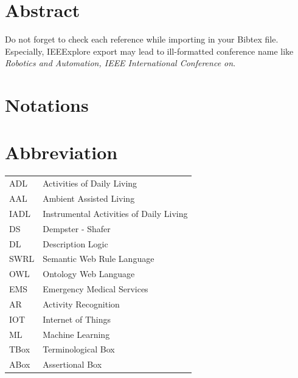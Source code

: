 \documentclass{thesisreport}
\begin{document}
  
 
\section*{Abstract}
   
 Do not forget to check each reference while importing in your Bibtex file.
 Especially, IEEExplore export may lead to ill-formatted conference name like \emph{Robotics and Automation, 
 IEEE International Conference on}.
 
 \newpage
 
 
\section*{Notations}
 
 \newpage
 
 \section*{Abbreviation}
 
 \begin{tabular}{p{2cm}p{12cm}}
 ADL & Activities of Daily Living\\
 AAL & Ambient Assisted Living \\
 IADL & Instrumental Activities of Daily Living \\
 DS & Dempster - Shafer \\
 DL & Description Logic \\
 SWRL & Semantic Web Rule Language\\
 OWL & Ontology Web Language\\
 EMS & Emergency Medical Services \\
 AR & Activity Recognition \\
 IOT & Internet of Things \\
 ML & Machine Learning \\
 TBox & Terminological Box \\
 ABox & Assertional Box \\
 \end{tabular}
 
 \newpage
 
 \listoffigures
 
 \listoftables
 
\end{document}
